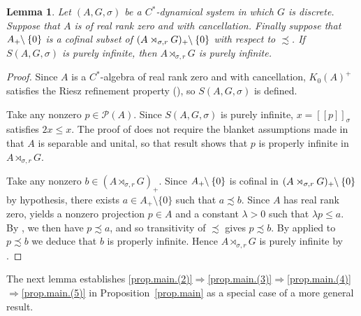 \documentclass[a4paper, 12pt]{amsart}
\numberwithin{equation}{section}
\newcounter{theorem}
\newtheorem{lemma}[theorem]{Lemma}
\theoremstyle{remark}
\theoremstyle{definition}
\begin{document}
\begin{lemma}\label{lem.pi}
Let $(A,G,\sigma)$ be a $C^*$-dynamical system in which $G$ is discrete. Suppose that $A$
is of real rank zero and with cancellation. Finally suppose that $A_+{\negthickspace}\setminus\{0\}$ is a
cofinal subset of $(A\rtimes_{\sigma,r} G)_+{\negthickspace}\setminus\{0\}$ with respect to
$\precsim$. If $S(A,G,\sigma)$ is purely infinite, then $A\rtimes_{\sigma,r} G$ is purely
infinite.
\end{lemma}
\begin{proof}
Since $A$ is a $C^*$-algebra of real rank  zero and with cancellation,  $K_0(A)^+$ satisfies
the Riesz refinement property (\cite{MR1301484, MR1150618}), so $S(A,G,\sigma)$ is
defined.

Take any nonzero $p\in {\mathcal{P}}(A)$. Since $S(A,G,\sigma)$ is purely infinite,
$x=[[p]]_\sigma$ satisfies $2x\leq x$. The proof of \cite[Proposition~4.17]{Rai} does not
require the blanket assumptions made in \cite{Rai} that $A$ is separable and unital, so
that result shows that $p$ is properly infinite in $A\rtimes_{\sigma,r} G$.

Take any nonzero $b\in (A\rtimes_{\sigma,r} G)_+$. Since
$A_+{\negthickspace}\setminus\{0\}$ is cofinal in $(A\rtimes_{\sigma,r}
G)_+{\negthickspace}\setminus\{0\}$ by hypothesis, there exists $a\in A_+ \setminus \{0\}$ such that
$a\precsim b$. Since $A$ has real rank zero, \cite[Lemma~5.3]{MR2873171} yields a nonzero
projection $p\in A$ and a constant $\lambda>0$ such that $\lambda p\leq a$. By
\cite[Lemma~2.3]{MR1172023}, we then have $p \precsim a$, and so transitivity of
$\precsim$ gives $p\precsim b$. By \cite[Lemma~3.8]{MR1759891} applied to $p\precsim b$
we deduce that $b$ is properly infinite. Hence $A\rtimes_{\sigma,r} G$ is purely infinite
by \cite[Theorem~4.16]{MR1759891}.
\end{proof}

The next lemma establishes \eqref{prop.main.(2)}$\Rightarrow$\eqref{prop.main.(3)}$\Rightarrow$\eqref{prop.main.(4)}$\Rightarrow$\eqref{prop.main.(5)} in
Proposition~\ref{prop.main} as a special case of a more general result.
\end{document}
